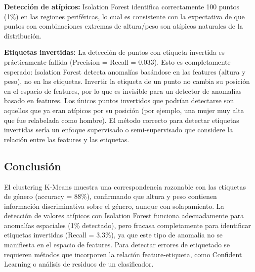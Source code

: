 \documentclass{article}
\begin{document}
\textbf{Detección de atípicos:} Isolation Forest identifica correctamente 100 puntos (1\%) en las regiones periféricas, lo cual es consistente con la expectativa de que puntos con combinaciones extremas de altura/peso son atípicos naturales de la distribución.

\textbf{Etiquetas invertidas:} La detección de puntos con etiqueta invertida es prácticamente fallida (Precision = Recall = 0.033). Esto es completamente esperado: Isolation Forest detecta anomalías basándose en las features (altura y peso), no en las etiquetas. Invertir la etiqueta de un punto no cambia su posición en el espacio de features, por lo que es invisible para un detector de anomalías basado en features. Los únicos puntos invertidos que podrían detectarse son aquellos que ya eran atípicos por su posición (por ejemplo, una mujer muy alta que fue relabelada como hombre). El método correcto para detectar etiquetas invertidas sería un enfoque supervisado o semi-supervisado que considere la relación entre las features y las etiquetas.

\subsection{Conclusión}

El clustering K-Means muestra una correspondencia razonable con las etiquetas de género (accuracy = 88\%), confirmando que altura y peso contienen información discriminativa sobre el género, aunque con solapamiento. La detección de valores atípicos con Isolation Forest funciona adecuadamente para anomalías espaciales (1\% detectado), pero fracasa completamente para identificar etiquetas invertidas (Recall = 3.3\%), ya que este tipo de anomalía no se manifiesta en el espacio de features. Para detectar errores de etiquetado se requieren métodos que incorporen la relación feature-etiqueta, como Confident Learning o análisis de residuos de un clasificador.




\end{document}
